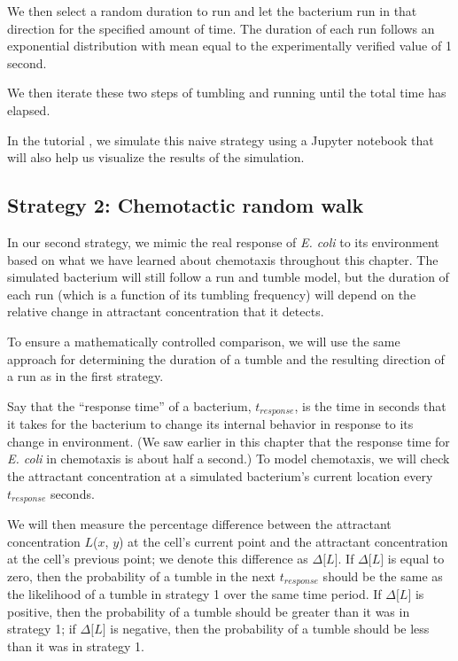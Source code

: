 We then select a random duration to run and let the bacterium run in that direction for the specified amount of time. The duration of each run follows an exponential distribution with mean equal to the experimentally verified value of 1 second.

We then iterate these two steps of tumbling and running until the total time has elapsed.

In the tutorial , we simulate this naive strategy using a Jupyter notebook that will also help us visualize the results of the simulation.

\FloatBarrier
{}
{}
\subsection{Strategy 2: Chemotactic random walk}


In our second strategy, we mimic the real response of \textit{E. coli} to its environment based on what we have learned about chemotaxis throughout this chapter. The simulated bacterium will still follow a run and tumble model, but the duration of each run (which is a function of its tumbling frequency) will depend on the relative change in attractant concentration that it detects.

To ensure a mathematically controlled comparison, we will use the same approach for determining the duration of a tumble and the resulting direction of a run as in the first strategy.

Say that the ``response time'' of a bacterium, $t_{response}$, is the time in seconds that it takes for the bacterium to change its internal behavior in response to its change in environment. (We saw earlier in this chapter that the response time for \textit{E. coli} in chemotaxis is about half a second.) To model chemotaxis, we will check the attractant concentration at a simulated bacterium's current location every $t_{response}$ seconds.

We will then measure the percentage difference between the attractant concentration $L$($x$, $y$) at the cell's current point and the attractant concentration at the cell's previous point; we denote this difference as $\Delta\text{[}L{]}$. If $\Delta\text{[}L{]}$ is equal to zero, then the probability of a tumble in the next $t_{response}$ should be the same as the likelihood of a tumble in strategy 1 over the same time period. If $\Delta\text{[}L{]}$ is positive, then the probability of a tumble should be greater than it was in strategy 1; if $\Delta\text{[}L{]}$ is negative, then the probability of a tumble should be less than it was in strategy 1.

